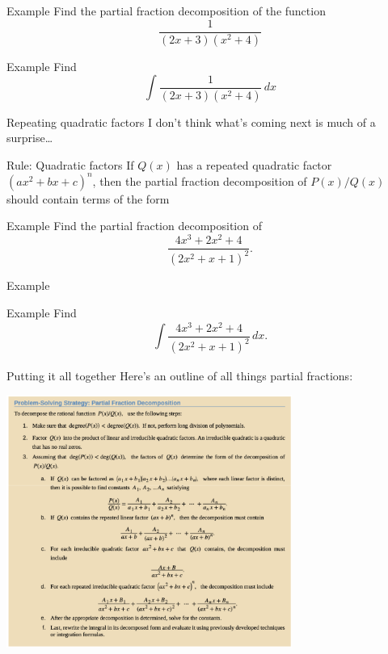 \documentclass[presentation]{beamer}
\begin{document}
\begin{frame}[label={sec:org5cccfae}]{Example}
Find the partial fraction decomposition of the function
\[
\frac{1}{\left( 2x+3 \right)(x^2+4)} \]
\vspace{10in}
\end{frame}

\begin{frame}[label={sec:orgf2a494e}]{Example}
Find
\[
\int \frac{1}{\left( 2x+3 \right)(x^2+4)}\,dx\]
\vspace{10in}
\end{frame}

\begin{frame}[label={sec:org2209180}]{Repeating quadratic factors}
I don't think what's coming next is much of a surprise\ldots{}
\begin{block}{Rule: Quadratic factors}
If \(Q(x)\) has a repeated quadratic factor \((ax^2+bx+c)^n\), then
the partial fraction decomposition of \(P(x)/Q(x)\) should contain
terms of the form
\[
\hspace{1in} \]
\phantom{butts}
\end{block}
\end{frame}

\begin{frame}[label={sec:org4824929}]{Example}
Find the partial fraction decomposition of
\[
\frac{4x^3+2x^2+4}{\left( 2x^2+x+1 \right)^2}. \]
\vspace{10in}
\end{frame}

\begin{frame}[label={sec:orge38d794}]{Example}
\end{frame}

\begin{frame}[label={sec:org4e75950}]{Example}
Find
\[
\int\limits_{}^{} \frac{4x^3+2x^2+4}{\left( 2x^2+x+1 \right)^2}\,dx. \]
\vspace{10in}
\end{frame}

\begin{frame}[label={sec:orgfd7b26e}]{Putting it all together}
Here's an outline of all things partial fractions:

\begin{center}
\includegraphics[width=0.7\textwidth]{../img/parfracF.png} \\
\end{center}
\end{frame}
\end{document}
